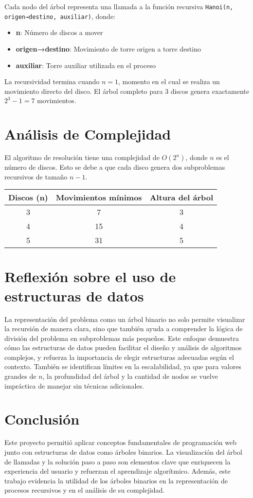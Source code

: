 \documentclass{article}
\begin{document}
Cada nodo del árbol representa una llamada a la función recursiva \texttt{Hanoi(n, origen→destino, auxiliar)}, donde:
\begin{itemize}
    \item \textbf{n}: Número de discos a mover
    \item \textbf{origen→destino}: Movimiento de torre origen a torre destino
    \item \textbf{auxiliar}: Torre auxiliar utilizada en el proceso
\end{itemize}

La recursividad termina cuando $n=1$, momento en el cual se realiza un movimiento directo del disco. El árbol completo para 3 discos genera exactamente $2^3 - 1 = 7$ movimientos.

\section{Análisis de Complejidad}
El algoritmo de resolución tiene una complejidad de $O(2^n)$, donde $n$ es el número de discos. Esto se debe a que cada disco genera dos subproblemas recursivos de tamaño $n-1$.

\begin{center}
    \begin{tabular}{|c|c|c|}
        \hline
        \textbf{Discos (n)} & \textbf{Movimientos mínimos} & \textbf{Altura del árbol} \\
        \hline
        3 & 7  & 3 \\
        4 & 15 & 4 \\
        5 & 31 & 5 \\
        \hline
    \end{tabular}
\end{center}

\section{Reflexión sobre el uso de estructuras de datos}
La representación del problema como un árbol binario no solo permite visualizar la recursión de manera clara, sino que también ayuda a comprender la lógica de división del problema en subproblemas más pequeños. Este enfoque demuestra cómo las estructuras de datos pueden facilitar el diseño y análisis de algoritmos complejos, y refuerza la importancia de elegir estructuras adecuadas según el contexto. También se identifican límites en la escalabilidad, ya que para valores grandes de $n$, la profundidad del árbol y la cantidad de nodos se vuelve impráctica de manejar sin técnicas adicionales.

\section{Conclusión}
Este proyecto permitió aplicar conceptos fundamentales de programación web junto con estructuras de datos como árboles binarios. La visualización del árbol de llamadas y la solución paso a paso son elementos clave que enriquecen la experiencia del usuario y refuerzan el aprendizaje algorítmico. Además, este trabajo evidencia la utilidad de los árboles binarios en la representación de procesos recursivos y en el análisis de su complejidad.
\end{document}
